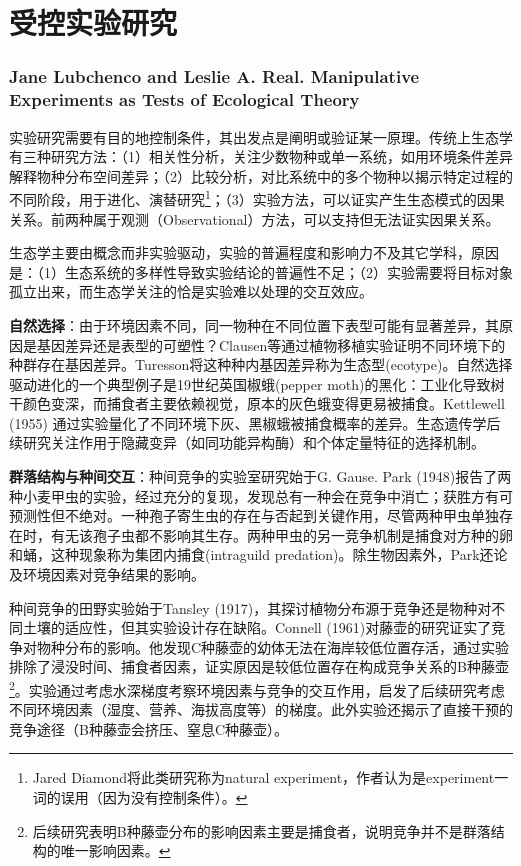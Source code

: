\section{受控实验研究}

\subsubsection*{Jane Lubchenco and Leslie A. Real. Manipulative Experiments as Tests of Ecological Theory}

实验研究需要有目的地控制条件，其出发点是阐明或验证某一原理。传统上生态学有三种研究方法：（1）相关性分析，关注少数物种或单一系统，如用环境条件差异解释物种分布空间差异；（2）比较分析，对比系统中的多个物种以揭示特定过程的不同阶段，用于进化、演替研究\footnote{Jared Diamond将此类研究称为natural experiment，作者认为是experiment一词的误用（因为没有控制条件）。}；（3）实验方法，可以证实产生生态模式的因果关系。前两种属于观测（Observational）方法，可以支持但无法证实因果关系。

生态学主要由概念而非实验驱动，实验的普遍程度和影响力不及其它学科，原因是：（1）生态系统的多样性导致实验结论的普遍性不足；（2）实验需要将目标对象孤立出来，而生态学关注的恰是实验难以处理的交互效应。

\textbf{自然选择}：由于环境因素不同，同一物种在不同位置下表型可能有显著差异，其原因是基因差异还是表型的可塑性？Clausen等通过植物移植实验证明不同环境下的种群存在基因差异。Turesson将这种种内基因差异称为生态型(ecotype)。自然选择驱动进化的一个典型例子是19世纪英国椒蛾(pepper moth)的黑化：工业化导致树干颜色变深，而捕食者主要依赖视觉，原本的灰色蛾变得更易被捕食。Kettlewell (1955) 通过实验量化了不同环境下灰、黑椒蛾被捕食概率的差异。生态遗传学后续研究关注作用于隐藏变异（如同功能异构酶）和个体定量特征的选择机制。

\textbf{群落结构与种间交互}：种间竞争的实验室研究始于G. Gause. Park (1948)报告了两种小麦甲虫的实验，经过充分的复现，发现总有一种会在竞争中消亡；获胜方有可预测性但不绝对。一种孢子寄生虫的存在与否起到关键作用，尽管两种甲虫单独存在时，有无该孢子虫都不影响其生存。两种甲虫的另一竞争机制是捕食对方种的卵和蛹，这种现象称为集团内捕食(intraguild predation)。除生物因素外，Park还论及环境因素对竞争结果的影响。

种间竞争的田野实验始于Tansley (1917)，其探讨植物分布源于竞争还是物种对不同土壤的适应性，但其实验设计存在缺陷。Connell (1961)对藤壶的研究证实了竞争对物种分布的影响。他发现C种藤壶的幼体无法在海岸较低位置存活，通过实验排除了浸没时间、捕食者因素，证实原因是较低位置存在构成竞争关系的B种藤壶\footnote{后续研究表明B种藤壶分布的影响因素主要是捕食者，说明竞争并不是群落结构的唯一影响因素。}。实验通过考虑水深梯度考察环境因素与竞争的交互作用，启发了后续研究考虑不同环境因素（湿度、营养、海拔高度等）的梯度。此外实验还揭示了直接干预的竞争途径（B种藤壶会挤压、窒息C种藤壶）。

